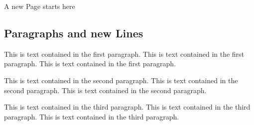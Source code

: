     {
        \pagebreak
        \nopagecolor
        A new Page starts here
    }
    \color{black}
    \pagebreak
    \begin{flushleft}   
    \section{Paragraphs and new Lines}
    This is text contained in the first paragraph.
    This is text contained in the first paragraph.
    This is text contained in the first paragraph.
    \par    %
    This is text contained in the second paragraph.
    This is text contained in the second paragraph.
    This is text contained in the second paragraph.

    This is text contained in the third paragraph.
    This is text contained in the third paragraph.
    This is text contained in the third paragraph.        
    \end{flushleft}

